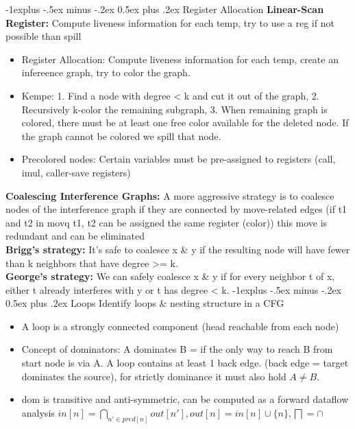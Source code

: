 \documentclass[10pt,landscape]{article}
\makeatletter
\renewcommand{\subsection}{\@startsection{subsection}{2}{0mm}%
                                {-1explus -.5ex minus -.2ex}%
                                {0.5ex plus .2ex}%
                                {\normalfont\normalsize\bfseries}}
\makeatother
\begin{document}
\begin{multicols}{3}
\subsection{Register Allocation}
\textbf{Linear-Scan Register:} Compute liveness information for each temp, try to use a reg if not possible than spill
\begin{itemize}
	\item Register Allocation: Compute liveness information for each temp, create an infereence graph, try to color the graph.
	\item Kempe: 1. Find a node with degree < k and cut it out of the graph, 2. Recursively k-color the remaining subgraph, 3. When remaining graph is colored, there must be at least one free color available for the deleted node. If the graph cannot be colored we spill that node.
	\item Precolored nodes: Certain variables must be pre-assigned to registers (call, imul, caller-save registers)
\end{itemize}
\textbf{Coalescing Interference Graphs:} A more aggressive strategy is to coalesce nodes of the interference
graph if they are connected by move-related edges (if t1 and t2 in movq t1, t2 can be assigned the same register (color)) this move is
redundant and can be eliminated\\
\textbf{Brigg's strategy:} It's safe to coalesce x \& y if the resulting node will have fewer than k neighbors that have degree >= k. \\
\textbf{George's strategy:} We can safely coalesce x \& y if for every neighbor t of x, either t already interferes with y or t has degree < k.
\subsection{Loops}
Identify loops \& nesting structure in a CFG
\begin{itemize}
	\item A loop is a strongly connected component (head reachable from each node)
	\item Concept of dominators: A dominates B = if the only way to reach B from start node is via A. A loop contains at least 1 back edge. (back edge = target dominates the source), for strictly dominance it must also hold $A \neq B$.
	\item dom is transitive and anti-symmetric, can be computed as a forward dataflow analysis $in[n] = \bigcap_{n' \in pred[n]}out[n'], out[n] = in[n] \cup \{n\}, \bigsqcap = \cap$
\end{itemize}

\end{multicols}
\end{document}
